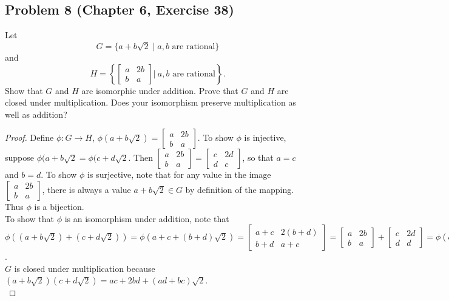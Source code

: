 \documentclass{article}
\begin{document}
\subsection*{Problem 8 (Chapter 6, Exercise 38)}
Let
\[ G = \{a + b\sqrt{2} \mid a, b \text{ are rational}\}\]
and
\[ H = \left\{\begin{bmatrix}
a & 2b \\
b & a \end{bmatrix} \bigg|\ a, b \text{ are rational}\right\}.\]
Show that $G$ and $H$ are isomorphic under addition. Prove that $G$ and $H$ are closed under multiplication. Does your isomorphism preserve multiplication as well as addition?

\begin{proof}

Define $\phi \colon G \to H$, $\phi(a + b\sqrt{2}) = \begin{bmatrix}
a & 2b \\
b & a \end{bmatrix}$. To show $\phi$ is injective, suppose $\phi(a + b\sqrt{2} = \phi(c + d\sqrt{2}$. Then $\begin{bmatrix}
a & 2b \\
b & a \end{bmatrix} = \begin{bmatrix}
c & 2d \\
d & c \end{bmatrix}$, so that $a = c$ and $b = d$. To show $\phi$ is surjective, note that for any value in the image $\begin{bmatrix}
a & 2b \\
b & a \end{bmatrix}$, there is always a value $a + b\sqrt{2} \in G$ by definition of the mapping. Thus $\phi$ is a bijection. \\
To show that $\phi$ is an isomorphism under addition, note that $\phi((a + b\sqrt{2}) + (c + d\sqrt{2})) = \phi(a+c+(b+d)\sqrt{2}) = \begin{bmatrix}
a+c & 2(b+d) \\
b+d & a+c \end{bmatrix} = \begin{bmatrix}
a & 2b \\
b & a \end{bmatrix} + \begin{bmatrix}
c & 2d \\
d & d \end{bmatrix} = \phi(a+b\sqrt{2}) + \phi(c+d\sqrt{2})$. \\
$G$ is closed under multiplication because $(a+b\sqrt{2})(c+d\sqrt{2}) = ac+2bd+(ad+bc)\sqrt{2}$. \\

\end{proof}
\end{document}
